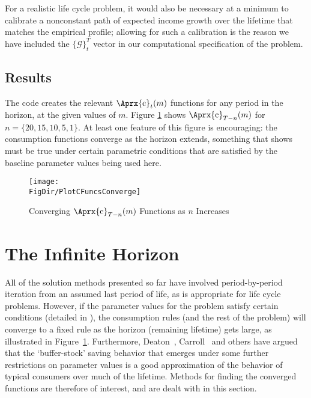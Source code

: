 \documentclass[titlepage, headings=optiontotocandhead]{Resources/texmf-local/tex/latex/econtex}
\newcommand{\MoM}{\ifthenelse{\boolean{MoMVersion}}}
\begin{document}
For a realistic life cycle problem, it would also be necessary at a
minimum to calibrate a nonconstant path of expected income growth over the
lifetime that matches the empirical profile; allowing for such
a calibration is the reason we have included the $\{\mathcal{G}\}_{t}^{T}$
vector in our computational specification of the problem.

\hypertarget{results}{}
\subsection{Results}

The code creates the relevant $\Aprx{\mathrm{c}}_{t}(m)$ functions for any period in the horizon, at the given values of $m$.  Figure \ref{fig:PlotCFuncsConverge} shows $\Aprx{\mathrm{c}}_{T-n}(m)$ for $n=\{20,15,10,5,1\}$.  At least one feature of this figure is encouraging: the consumption functions converge as the horizon extends, something that \cite{BufferStockTheory} shows must be true under certain parametric conditions that are satisfied by the baseline parameter values being used here.

\hypertarget{PlotCFuncsConverge}{}
\begin{figure}
  \texttt{[image: \\FigDir/PlotCFuncsConverge]}
  \caption{Converging $\Aprx{\mathrm{c}}_{T-n}(m)$ Functions as $n$ Increases}
  \label{fig:PlotCFuncsConverge}
\end{figure}



\hypertarget{the-infinite-horizon}{}
\section{The Infinite Horizon}\label{sec:the-infinite-horizon}

All of the solution methods presented so far have involved period-by-period iteration from an assumed last period of life, as is appropriate for life cycle problems.  However, if the parameter values for the problem satisfy certain conditions (detailed in \cite{BufferStockTheory}), the consumption rules (and the rest of the problem) will converge to a fixed rule as the horizon (remaining lifetime) gets large, as illustrated in Figure~\ref{fig:PlotCFuncsConverge}.  Furthermore, Deaton~\citeyearpar{deatonLiqConstr}, Carroll~\citeyearpar{carroll:brookings,carrollBSLCPIH} and others have argued that the `buffer-stock' saving behavior that emerges under some further restrictions on parameter values is a good approximation of the behavior of typical consumers over much of the lifetime.  Methods for finding the converged functions are therefore of interest, and are dealt with in this section.
\end{document}
